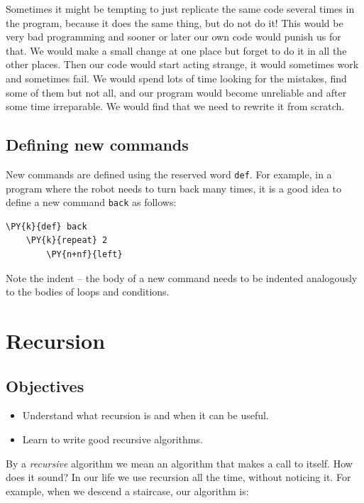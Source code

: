 Sometimes it might be 
tempting to just replicate the same code several times in the 
program, because it does the same thing, but do not do it! This would be very bad programming
and sooner or later our own code would punish us for that. 
We would make a small change at one place but forget to do it 
in all the other places. Then our code would start 
acting strange, it would sometimes work and sometimes fail. 
We would spend lots of time looking for the mistakes, find some 
of them but not all, and our program would become unreliable
and after some time irreparable. We would find that we need to 
rewrite it from scratch.

\subsection{Defining new commands}

New commands are defined using the reserved word 
{\tt def}. For example, in a program where the robot needs to turn back
many times, it is a good idea to define a new command {\tt back}
as follows:\\

\begin{bbox}
\begin{Verbatim}[commandchars=\\\{\}]
\PY{k}{def} back
    \PY{k}{repeat} 2
        \PY{n+nf}{left}
\end{Verbatim}
\end{bbox}
\vspace{6mm}

\noindent
Note the indent -- the body of a new command needs to be indented 
analogously to the bodies of loops and conditions.


\section{Recursion} \label{sec:recursion}

\subsection{Objectives} 
 
\begin{itemize}
\item Understand what recursion is and when it can be useful.
\item Learn to write good recursive algorithms.
\end{itemize}
By a {\em recursive} algorithm we mean an algorithm that makes a call to itself. How does it sound?
In our life we use recursion all the time, without noticing it. For example, when we descend 
a staircase, our algorithm is:\\

